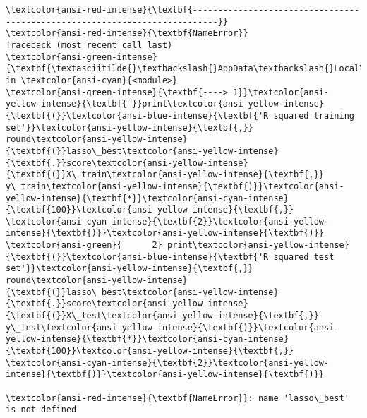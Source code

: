 \documentclass[11pt]{article}
\begin{document}
    \begin{Verbatim}[commandchars=\\\{\}, frame=single, framerule=2mm, rulecolor=\color{outerrorbackground}]
\textcolor{ansi-red-intense}{\textbf{---------------------------------------------------------------------------}}
\textcolor{ansi-red-intense}{\textbf{NameError}}                                 Traceback (most recent call last)
\textcolor{ansi-green-intense}{\textbf{\textasciitilde{}\textbackslash{}AppData\textbackslash{}Local\textbackslash{}Temp/ipykernel\_8232/859421468.py}} in \textcolor{ansi-cyan}{<module>}
\textcolor{ansi-green-intense}{\textbf{----> 1}}\textcolor{ansi-yellow-intense}{\textbf{ }}print\textcolor{ansi-yellow-intense}{\textbf{(}}\textcolor{ansi-blue-intense}{\textbf{'R squared training set'}}\textcolor{ansi-yellow-intense}{\textbf{,}} round\textcolor{ansi-yellow-intense}{\textbf{(}}lasso\_best\textcolor{ansi-yellow-intense}{\textbf{.}}score\textcolor{ansi-yellow-intense}{\textbf{(}}X\_train\textcolor{ansi-yellow-intense}{\textbf{,}} y\_train\textcolor{ansi-yellow-intense}{\textbf{)}}\textcolor{ansi-yellow-intense}{\textbf{*}}\textcolor{ansi-cyan-intense}{\textbf{100}}\textcolor{ansi-yellow-intense}{\textbf{,}} \textcolor{ansi-cyan-intense}{\textbf{2}}\textcolor{ansi-yellow-intense}{\textbf{)}}\textcolor{ansi-yellow-intense}{\textbf{)}}
\textcolor{ansi-green}{      2} print\textcolor{ansi-yellow-intense}{\textbf{(}}\textcolor{ansi-blue-intense}{\textbf{'R squared test set'}}\textcolor{ansi-yellow-intense}{\textbf{,}} round\textcolor{ansi-yellow-intense}{\textbf{(}}lasso\_best\textcolor{ansi-yellow-intense}{\textbf{.}}score\textcolor{ansi-yellow-intense}{\textbf{(}}X\_test\textcolor{ansi-yellow-intense}{\textbf{,}} y\_test\textcolor{ansi-yellow-intense}{\textbf{)}}\textcolor{ansi-yellow-intense}{\textbf{*}}\textcolor{ansi-cyan-intense}{\textbf{100}}\textcolor{ansi-yellow-intense}{\textbf{,}} \textcolor{ansi-cyan-intense}{\textbf{2}}\textcolor{ansi-yellow-intense}{\textbf{)}}\textcolor{ansi-yellow-intense}{\textbf{)}}

\textcolor{ansi-red-intense}{\textbf{NameError}}: name 'lasso\_best' is not defined
    \end{Verbatim}
\end{document}
